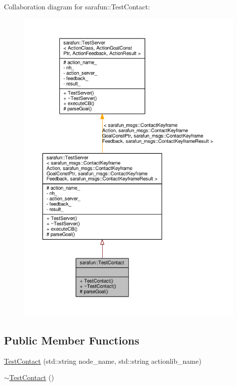 Collaboration diagram for sarafun\-:\-:Test\-Contact\-:
\nopagebreak
\begin{figure}[H]
\begin{center}
\leavevmode
\includegraphics[width=350pt]{dd/d1c/classsarafun_1_1TestContact__coll__graph}
\end{center}
\end{figure}
\subsection*{Public Member Functions}
\begin{DoxyCompactItemize}
\item 
\hyperlink{classsarafun_1_1TestContact_a0b2c1e94e50342e0433ea04919c31189_a0b2c1e94e50342e0433ea04919c31189}{Test\-Contact} (std\-::string node\-\_\-name, std\-::string actionlib\-\_\-name)
\item 
\hyperlink{classsarafun_1_1TestContact_a8b045e1f7984add10b7c024b6fde69ed_a8b045e1f7984add10b7c024b6fde69ed}{$\sim$\-Test\-Contact} ()
\end{DoxyCompactItemize}
